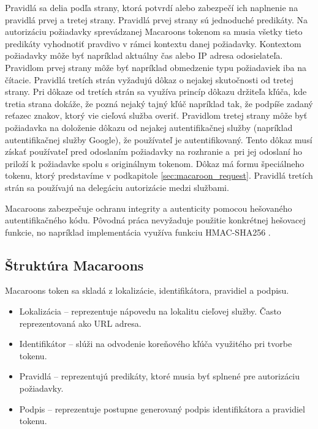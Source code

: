 Pravidlá sa delia podľa strany, ktorá potvrdí alebo zabezpečí ich naplnenie na pravidlá prvej a tretej strany. Pravidlá prvej strany sú jednoduché predikáty. Na autorizáciu požiadavky sprevádzanej Macaroons tokenom sa musia všetky tieto predikáty vyhodnotiť pravdivo v rámci kontextu danej požiadavky. Kontextom požiadavky môže byť napríklad aktuálny čas alebo IP adresa odosielateľa. Pravidlom prvej strany môže byť napríklad obmedzenie typu požiadaviek iba na čítacie. Pravidlá tretích strán vyžadujú dôkaz o nejakej skutočnosti od tretej strany. Pri dôkaze od tretích strán sa využíva princíp dôkazu držiteľa kľúča, kde tretia strana dokáže, že pozná nejaký tajný kľúč napríklad tak, že podpíše zadaný reťazec znakov, ktorý vie cieľová služba overiť. Pravidlom tretej strany môže byť požiadavka na doloženie dôkazu od nejakej autentifikačnej služby (napríklad autentifikačnej služby Google), že používateľ je autentifikovaný. Tento dôkaz musí získať používateľ pred odoslaním požiadavky na rozhranie a~pri jej odoslaní ho priloží k požiadavke spolu s originálnym tokenom. Dôkaz má formu špeciálneho tokenu, ktorý predstavíme v podkapitole \ref{sec:macaroon_request}. Pravidlá tretích strán sa používajú na delegáciu autorizácie medzi službami.

Macaroons zabezpečuje ochranu integrity a autenticity pomocou hešovaného autentifikačného kódu. Pôvodná práca \cite{macaroons_paper} nevyžaduje použitie konkrétnej hešovacej funkcie, no napríklad implementácia \cite{macaroons_git} využíva funkciu HMAC-SHA256 \cite{hmac}.

\subsection{Štruktúra Macaroons}

Macaroons token sa skladá z lokalizácie, identifikátora, pravidiel a podpisu. 

\begin{itemize}
    \item Lokalizácia -- reprezentuje nápovedu na lokalitu cieľovej služby. Často reprezentovaná ako URL adresa.
    \item Identifikátor -- slúži na odvodenie koreňového kľúča využitého pri tvorbe tokenu.
    \item Pravidlá -- reprezentujú predikáty, ktoré musia byť splnené pre autorizáciu požiadavky.
    \item Podpis -- reprezentuje postupne generovaný podpis identifikátora a pravidiel tokenu.
\end{itemize}

